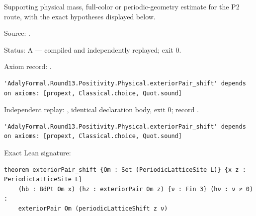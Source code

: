 \begin{theorem}[bp-471]
\label{bp-471}
\leanok
Supporting physical mass, full-color or periodic-geometry estimate for the P2 route, with the exact hypotheses displayed below.

\par Source: \texttt{}.
\par Status: A — compiled and independently replayed; exit 0.
\par Axiom record: \texttt{}.
\begin{verbatim}
'AdalyFormal.Round13.Positivity.Physical.exteriorPair_shift' depends on axioms: [propext, Classical.choice, Quot.sound]
\end{verbatim}
\par Independent replay: \texttt{}, identical declaration body, exit 0; record \texttt{}.
\begin{verbatim}
'AdalyFormal.Round13.Positivity.Physical.exteriorPair_shift' depends on axioms: [propext, Classical.choice, Quot.sound]
\end{verbatim}
\par Exact Lean signature:
\begin{verbatim}
theorem exteriorPair_shift {Om : Set (PeriodicLatticeSite L)} {x z : PeriodicLatticeSite L}
    (hb : BdPt Om x) (hz : exteriorPair Om z) {ν : Fin 3} (hν : ν ≠ 0) :
    exteriorPair Om (periodicLatticeShift z ν)
\end{verbatim}
\end{theorem}

